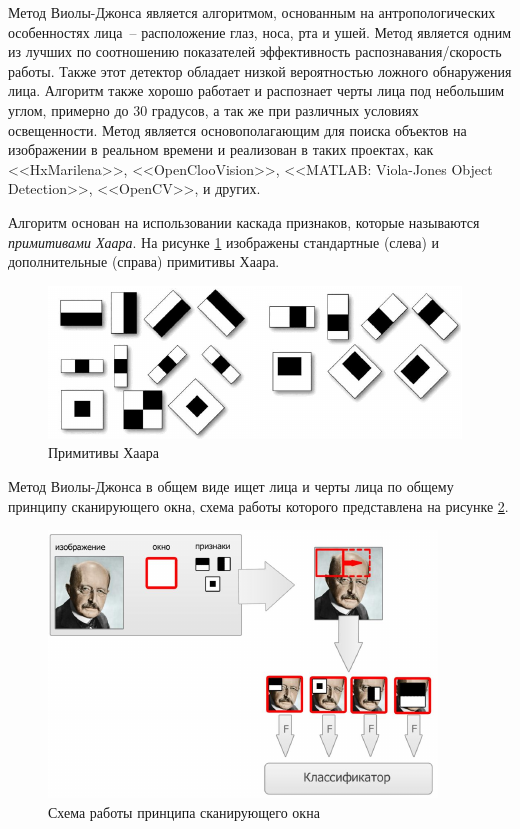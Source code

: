 Метод Виолы-Джонса \cite{viola_jones_2} является алгоритмом, основанным на антропологических особенностях лица~-- расположение
глаз, носа, рта и ушей. Метод является одним из лучших по соотношению показателей эффективность 
распознавания/скорость работы. Также этот детектор обладает низкой вероятностью ложного 
обнаружения лица. Алгоритм также хорошо работает и распознает черты лица под небольшим углом, 
примерно до 30 градусов, а так же при различных условиях освещенности.
Метод является основополагающим для поиска объектов на изображении в реальном времени и
реализован в таких проектах, как <<HxMarilena>>\cite{hxmerilena}, <<OpenClooVision>>\cite{cloovision}, <<MATLAB: Viola-Jones
Object Detection>>\cite{viola_matlab}, <<OpenCV>>\cite{opencv}, и других.

Алгоритм основан на использовании каскада признаков, которые называются \textit{примитивами Хаара}.
На рисунке \ref{fig:haar} изображены стандартные (слева) и дополнительные (справа) примитивы Хаара.

\begin{figure}[hbt!]
    \centering
    \includegraphics{haars.png}
    \caption{Примитивы Хаара}
    \label{fig:haar}
\end{figure}

Метод Виолы-Джонса в общем виде ищет лица и черты лица по общему принципу сканирующего окна, схема работы которого
представлена на рисунке \ref{fig:slide_win}.

\begin{figure}[hbt!]
    \centering
    \includegraphics{slide_win.png}
    \caption{Схема работы принципа сканирующего окна}
    \label{fig:slide_win}
\end{figure}

